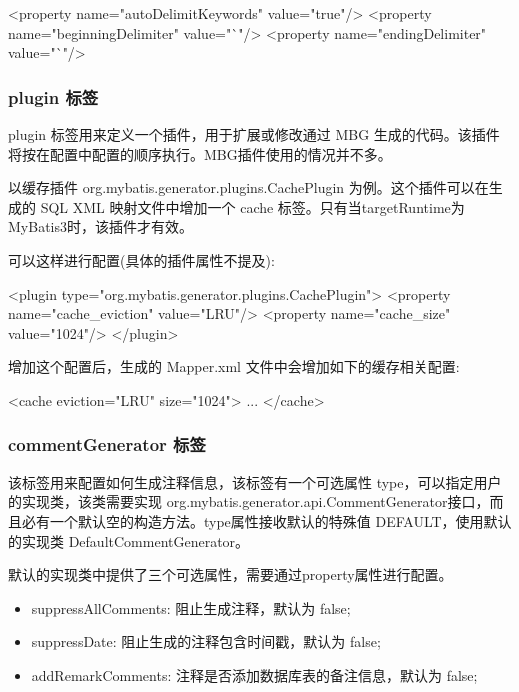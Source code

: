 \begin{xml}
<property name="autoDelimitKeywords" value="true"/>
<property name="beginningDelimiter" value="`"/>
<property name="endingDelimiter" value="`"/>
\end{xml}

\subsubsection*{plugin 标签}

plugin 标签用来定义一个插件，用于扩展或修改通过 MBG 生成的代码。该插件将按在配置中配置的顺序执行。MBG插件使用的情况并不多。

以缓存插件 org.mybatis.generator.plugins.CachePlugin 为例。这个插件可以在生成的 SQL XML 映射文件中增加一个 cache 标签。只有当targetRuntime为MyBatis3时，该插件才有效。

可以这样进行配置(具体的插件属性不提及):

\begin{xml}
<plugin type="org.mybatis.generator.plugins.CachePlugin">
    <property name="cache_eviction" value="LRU"/>
    <property name="cache_size" value="1024"/>
</plugin>
\end{xml}

增加这个配置后，生成的 Mapper.xml 文件中会增加如下的缓存相关配置:

\begin{xml}
<cache eviction="LRU" size="1024">
...
</cache>
\end{xml}

\subsubsection*{commentGenerator 标签}

该标签用来配置如何生成注释信息，该标签有一个可选属性 type，可以指定用户的实现类，该类需要实现 org.mybatis.generator.api.CommentGenerator接口，而且必有一个默认空的构造方法。type属性接收默认的特殊值 DEFAULT，使用默认的实现类 DefaultCommentGenerator。

默认的实现类中提供了三个可选属性，需要通过property属性进行配置。
\begin{itemize}
    \item suppressAllComments: 阻止生成注释，默认为 false;
    \item suppressDate: 阻止生成的注释包含时间戳，默认为 false;
    \item addRemarkComments: 注释是否添加数据库表的备注信息，默认为 false;
\end{itemize}


